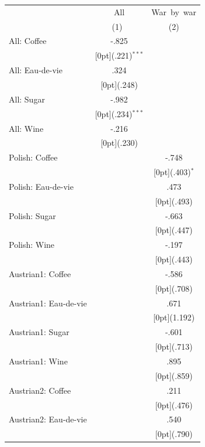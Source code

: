 \documentclass[12pt,a4paper,titlepage]{article}
\begin{document}
 \label{tab:title} 
{
\begin{tabular*}{\textwidth}{@{\extracolsep{\fill}}lcc}		
	& \multicolumn{1}{c}{All} &	\multicolumn{1}{c}{War~by~war} \\
\cline{2-3}		
	& \multicolumn{1}{c}{(1)\mbox{\ }} &	\multicolumn{1}{c}{(2)} \\
\hline		
All: Coffee &	-.825 &	\\
&	\raisebox{.7ex}[0pt]{\scriptsize (.221)$^{***}$} &	\\
All: Eau-de-vie &	.324 &	\\
&	\raisebox{.7ex}[0pt]{\scriptsize (.248)} &	\\
All: Sugar &	-.982 &	\\
&	\raisebox{.7ex}[0pt]{\scriptsize (.234)$^{***}$} &	\\
All: Wine &	-.216 &	\\
&	\raisebox{.7ex}[0pt]{\scriptsize (.230)} &	\\
Polish: Coffee &	&	-.748 \\
&	&	\raisebox{.7ex}[0pt]{\scriptsize (.403)$^{*}$} \\
Polish: Eau-de-vie &	&	.473 \\
&	&	\raisebox{.7ex}[0pt]{\scriptsize (.493)} \\
Polish: Sugar &	&	-.663 \\
&	&	\raisebox{.7ex}[0pt]{\scriptsize (.447)} \\
Polish: Wine &	&	-.197 \\
&	&	\raisebox{.7ex}[0pt]{\scriptsize (.443)} \\
Austrian1: Coffee &	&	-.586 \\
&	&	\raisebox{.7ex}[0pt]{\scriptsize (.708)} \\
Austrian1: Eau-de-vie &	&	.671 \\
&	&	\raisebox{.7ex}[0pt]{\scriptsize (1.192)} \\
Austrian1: Sugar &	&	-.601 \\
&	&	\raisebox{.7ex}[0pt]{\scriptsize (.713)} \\
Austrian1: Wine &	&	.895 \\
&	&	\raisebox{.7ex}[0pt]{\scriptsize (.859)} \\
Austrian2: Coffee &	&	.211 \\
&	&	\raisebox{.7ex}[0pt]{\scriptsize (.476)} \\
Austrian2: Eau-de-vie &	&	.540 \\
&	&	\raisebox{.7ex}[0pt]{\scriptsize (.790)} \\

\end{tabular*}}
\end{document}
